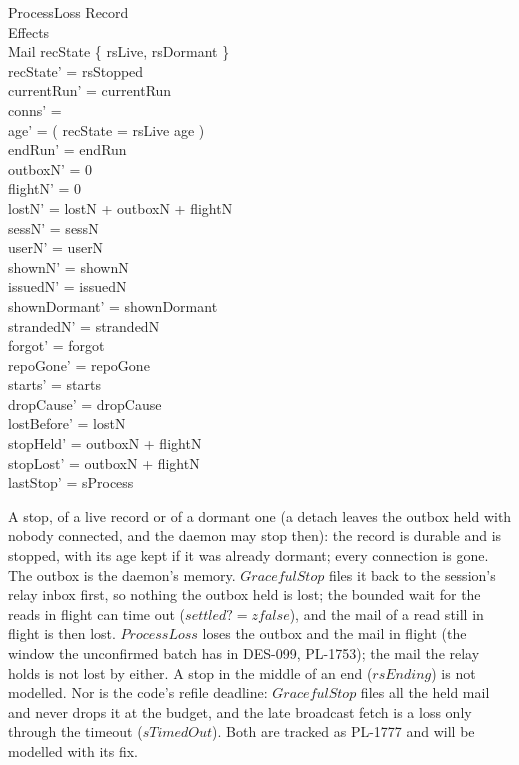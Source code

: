 \documentclass[a4paper,10pt,fleqn]{article}
\begin{document}
\begin{schema}{ProcessLoss}
  \Delta Record \\
  \Xi Effects \\
  \Delta Mail
  \where
  recState \in \{ rsLive, rsDormant \} \\
  recState' = rsStopped \\
  currentRun' = currentRun \\
  conns' = \emptyset \\
  age' = ( \IF recState = rsLive  \ELSE age ) \\
  endRun' = endRun \\
  outboxN' = 0 \\
  flightN' = 0 \\
  lostN' = lostN + outboxN + flightN \\
  sessN' = sessN \\
  userN' = userN \\
  shownN' = shownN \\
  issuedN' = issuedN \\
  shownDormant' = shownDormant \\
  strandedN' = strandedN \\
  forgot' = forgot \\
  repoGone' = repoGone \\
  starts' = starts \\
  dropCause' = dropCause \\
  lostBefore' = lostN \\
  stopHeld' = outboxN + flightN \\
  stopLost' = outboxN + flightN \\
  lastStop' = sProcess
\end{schema}

A stop, of a live record or of a dormant one (a detach leaves the outbox held
with nobody connected, and the daemon may stop then): the record is durable and
is stopped, with its age kept if it was already dormant; every connection
is gone.  The outbox is the daemon's memory.  $GracefulStop$ files it back to the
session's relay inbox first, so nothing the outbox held is lost; the bounded wait
for the reads in flight can time out ($settled? = zfalse$), and the mail of a read
still in flight is then lost.  $ProcessLoss$ loses the outbox and the mail in
flight (the window the unconfirmed batch has in DES-099, PL-1753); the mail the
relay holds is not lost by either.  A stop in the middle of an end ($rsEnding$) is
not modelled.  Nor is the code's refile deadline: $GracefulStop$ files all the held mail and never
drops it at the budget, and the late broadcast fetch is a loss only through the timeout
($sTimedOut$).  Both are tracked as PL-1777 and will be modelled with its fix.
\end{document}
